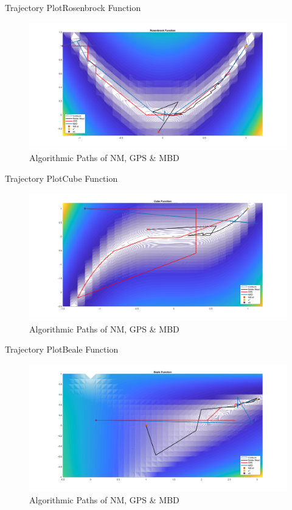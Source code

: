 \documentclass[10pt]{beamer}
\begin{document}
	\begin{frame}{Trajectory Plot}{Rosenbrock Function}
		\begin{figure}
			\includegraphics[width=\linewidth]{RosenbrockContour.jpg}
			\caption{Algorithmic Paths of NM, GPS \& MBD}
		\end{figure}
	\end{frame}
	
	\begin{frame}{Trajectory Plot}{Cube Function}
		\begin{figure}
			\includegraphics[width=\linewidth]{CubeContour.jpg}
			\caption{Algorithmic Paths of NM, GPS \& MBD}
		\end{figure}
	\end{frame}

	\begin{frame}{Trajectory Plot}{Beale Function}
		\begin{figure}
			\includegraphics[width=\linewidth]{BealeContour.jpg}
			\caption{Algorithmic Paths of NM, GPS \& MBD}
		\end{figure}
	\end{frame}
\end{document}
